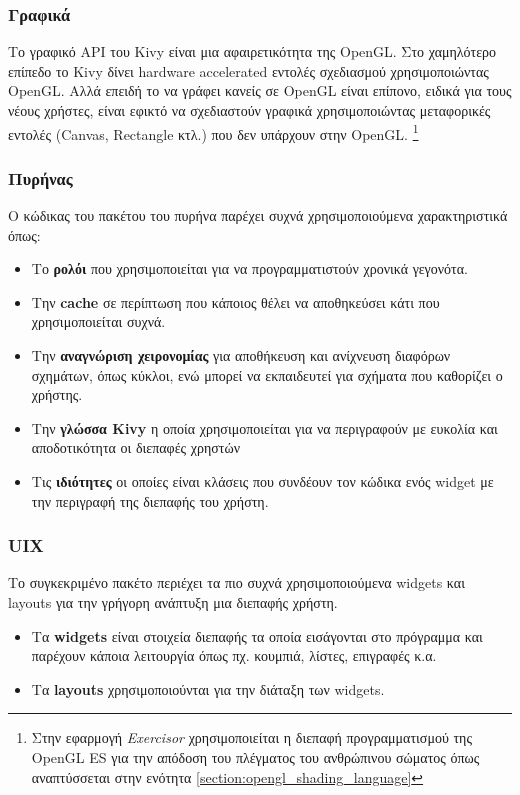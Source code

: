 \subsubsection{Γραφικά}
Το γραφικό API του Kivy είναι μια αφαιρετικότητα της OpenGL. Στο χαμηλότερο επίπεδο το Kivy δίνει hardware accelerated εντολές σχεδιασμού χρησιμοποιώντας OpenGL. Αλλά επειδή το να γράφει κανείς σε OpenGL είναι επίπονο, ειδικά για τους νέους χρήστες, είναι εφικτό να σχεδιαστούν γραφικά χρησιμοποιώντας μεταφορικές εντολές (Canvas, Rectangle κτλ.) που δεν υπάρχουν στην OpenGL. \footnote{Στην εφαρμογή \textsl{Exercisor} χρησιμοποιείται η διεπαφή προγραμματισμού της OpenGL ES για την απόδοση του πλέγματος του ανθρώπινου σώματος όπως αναπτύσσεται στην ενότητα \ref{section:opengl_shading_language}}

\subsubsection{Πυρήνας}
Ο κώδικας του πακέτου του πυρήνα παρέχει συχνά χρησιμοποιούμενα χαρακτηριστικά όπως:
\begin{itemize}
    \item Το \textbf{ρολόι} που χρησιμοποιείται για να προγραμματιστούν χρονικά γεγονότα.
    \item Την \textbf{cache} σε περίπτωση που κάποιος θέλει να αποθηκεύσει κάτι που χρησιμοποιείται συχνά.
    \item Την \textbf{αναγνώριση χειρονομίας} για αποθήκευση και ανίχνευση διαφόρων σχημάτων, όπως κύκλοι, ενώ μπορεί να εκπαιδευτεί για σχήματα που καθορίζει ο χρήστης.
    \item Την \textbf{γλώσσα Kivy} η οποία χρησιμοποιείται για να περιγραφούν με ευκολία και αποδοτικότητα οι διεπαφές χρηστών
    \item Τις \textbf{ιδιότητες} οι οποίες είναι κλάσεις που συνδέουν τον κώδικα ενός widget με την περιγραφή της διεπαφής του χρήστη.
\end{itemize}

\subsubsection{UIX}
Το συγκεκριμένο πακέτο περιέχει τα πιο συχνά χρησιμοποιούμενα widgets και layouts για την γρήγορη ανάπτυξη μια διεπαφής χρήστη.
\begin{itemize}
    \item Τα \textbf{widgets} είναι στοιχεία διεπαφής τα οποία εισάγονται στο πρόγραμμα και παρέχουν κάποια λειτουργία όπως πχ. κουμπιά, λίστες, επιγραφές κ.α.
    \item Τα \textbf{layouts} χρησιμοποιούνται για την διάταξη των widgets.
\end{itemize}